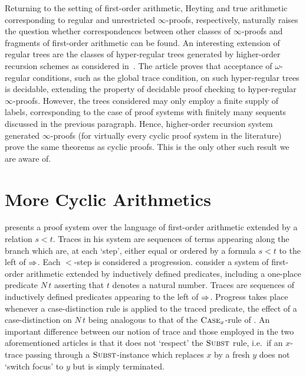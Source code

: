 Returning to the setting of first-order arithmetic, Heyting and true arithmetic
corresponding to regular and unrestricted $\infty$-proofs, respectively,
naturally raises the question whether correspondences between other classes of
$\infty$-proofs and fragments of first-order arithmetic can be found. An
interesting extension of regular trees are the classes of hyper-regular
trees generated by higher-order recursion schemes as considered
in~\textcite{ongModelCheckingTreesGenerated2006}. The article proves that
acceptance of $\omega$-regular conditions, such as the global trace condition,
on such hyper-regular trees is decidable, extending the property of
decidable proof checking to hyper-regular $\infty$-proofs. However, the trees
considered may only employ a finite supply of labels, corresponding to the case
of proof systems with finitely many sequents discussed in the previous
paragraph. Hence, higher-order recursion system generated $\infty$-proofs (for
virtually every cyclic proof system in the literature) prove the same theorems
as cyclic proofs. This is the only other such result we are aware of.

\section{More Cyclic Arithmetics}
\label{sec:more-cas}

\textcite{simpsonCyclicArithmeticEquivalent2017} presents a proof system over
the language of first-order arithmetic extended by a relation $s < t$. Traces in
his system are sequences of terms appearing along the branch which are, at each
`step', either equal or ordered by a formula $s < t$ to the left of $\Rightarrow$.
Each $<$-step is considered a progression.
\textcite{berardiEquivalenceInductiveDefinitions2017} consider a system of
first-order arithmetic extended by inductively defined predicates, including a
one-place predicate $N\,t$ asserting that $t$ denotes a natural number.
Traces are sequences of inductively defined predicates appearing
to the left of $\Rightarrow$. Progress takes place whenever a case-distinction rule
is applied to the traced predicate, the effect of a case-distinction on $N\,t$
being analogous to that of the $\textsc{Case}_{x}$-rule of .
An important difference between our notion of trace and those employed in the two
aforementioned articles is that it does not `respect' the $\textsc{Subst}$ rule, i.e.\
if an $x$-trace passing through a $\textsc{Subst}$-instance which replaces $x$ by a
fresh $y$ does not `switch focus' to $y$ but is simply terminated.



